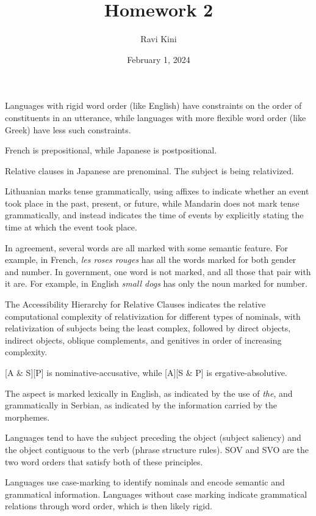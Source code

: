 \documentclass{article}
\title{Homework 2}
\author{Ravi Kini}
\date{February 1, 2024}
\begin{document}
\maketitle

\problem
Languages with rigid word order (like English) have constraints on the order of constituents in an utterance, while languages with more flexible word order (like Greek) have less such constraints.

\clearpage

\problem
French is prepositional, while Japanese is postpositional.

\clearpage

\problem
{}
Relative clauses in Japanese are prenominal.
The subject is being relativized.

\clearpage

\problem
Lithuanian marks tense grammatically, using affixes to indicate whether an event took place in the past, present, or future, while Mandarin does not mark tense grammatically, and instead indicates the time of events by explicitly stating the time at which the event took place.

\clearpage

\problem
In agreement, several words are all marked with some semantic feature. For example, in French, \textit{les roses rouges} has all the words marked for both gender and number. In government, one word is not marked, and all those that pair with it are. For example, in English \textit{small dogs} has only the noun marked for number.

\clearpage

\problem
The Accessibility Hierarchy for Relative Clauses indicates the relative computational complexity of relativization for different types of nominals, with relativization of subjects being the least complex, followed by direct objects, indirect objects, oblique complements, and genitives in order of increasing complexity.

\clearpage

\problem

[A \& S][P] is nominative-accusative, while [A][S \& P] is ergative-absolutive.

\clearpage

\problem
The aspect is marked lexically in English, as indicated by the use of \textit{the}, and grammatically in Serbian, as indicated by the information carried by the morphemes.

\clearpage

\problem
Languages tend to have the subject preceding the object (subject saliency) and the object contiguous to the verb (phrase structure rules). SOV and SVO are the two word orders that satisfy both of these principles.

\clearpage

\problem
Languages use case-marking to identify nominals and encode semantic and grammatical information. Languages without case marking indicate grammatical relations through word order, which is then likely rigid.
\end{document}

